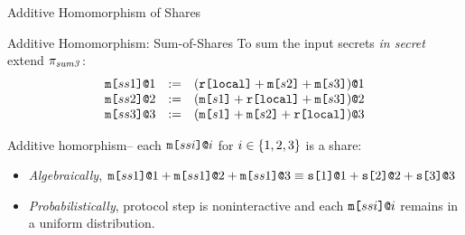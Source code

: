 \documentclass{beamer}
\begin{document}
\begin{frame}{Additive Homomorphism of Shares}

  
  \begin{block}{Additive Homomorphism: Sum-of-Shares}     
  To sum the input secrets \emph{in secret} extend $\pi_{\mathit{sum3}}$:
    $$
    \begin{array}{lll}
      \texttt{m[}ss1\texttt{]}\texttt{@}1 &:=& (\texttt{r[}\mathtt{local}\texttt{]} + \texttt{m[}s2\texttt{]} + \texttt{m[}s3\texttt{]})\texttt{@}1 \\ 
      \texttt{m[}ss2\texttt{]}\texttt{@}2 &:=& (\texttt{m[}s1\texttt{]} + \texttt{r[}\mathtt{local}\texttt{]} + \texttt{m[}s3\texttt{]})\texttt{@}2 \\
      \texttt{m[}ss3\texttt{]}\texttt{@}3 &:=& (\texttt{m[}s1\texttt{]} + \texttt{m[}s2\texttt{]} + \texttt{r[}\mathtt{local}\texttt{]})\texttt{@}3 
    \end{array}
    $$
  \end{block}

  Additive homorphism-- each $\texttt{m[}ssi\texttt{]}\texttt{@}i$ for $i \in \{ 1,2,3 \}$ is a share:
  \begin{itemize}
  \item \emph{Algebraically}, $\texttt{m[}ss1\texttt{]}\texttt{@}1 + \texttt{m[}ss1\texttt{]}\texttt{@}2 + \texttt{m[}ss1\texttt{]}\texttt{@}3 \equiv \texttt{s[}1\texttt{]}\texttt{@}1 + \texttt{s[}2\texttt{]}\texttt{@}2 + \texttt{s[}3\texttt{]}\texttt{@}3$ 
  \item \emph{Probabilistically}, protocol step is noninteractive and each $\texttt{m[}ssi\texttt{]}\texttt{@}i$ remains in a uniform distribution.
  \end{itemize}
  
\end{frame}

\begin{comment}
\begin{frame}{Example contd.: Output}

  \begin{itemize}
    \item Any $\mx{ss1}{*},\mx{ss2}{*},\mx{ss3}{*}$ such that:
    $$
    \mx{ss1}{*} + \ \mx{ss2}{*} + \ \mx{ss3}{*} \eop \sx{1}{1} + \sx{2}{2}  + \sx{3}{3}
    $$
    are \cemph{equally likely}.
  \end{itemize}

  \begin{block}{Client Outputs}
    $$
    \begin{array}{lll}
      \out{1} &:=& \elab{(\mesg{ss1} \fplus \mesg{ss2} + \mesg{ss3})}{1}\\
      \out{2} &:=& \elab{(\mesg{ss1} \fplus \mesg{ss2} + \mesg{ss3})}{2}\\
      \out{3} &:=& \elab{(\mesg{ss1} \fplus \mesg{ss2} + \mesg{ss3})}{3}
    \end{array}
    $$
  \end{block}
  
  
\end{frame}
\end{comment}
\end{document}
